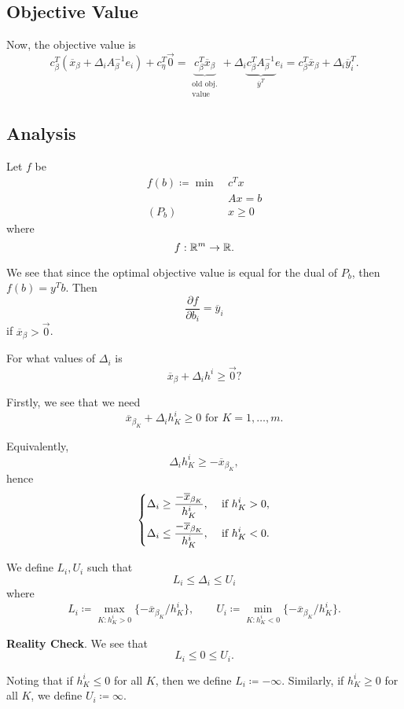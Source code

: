 \subsection{Objective Value}
Now, the objective value is
\[
	c_{\beta}^{T}(\overline{x}_{\beta}+\Delta_{i}A_{\beta}^{-1}e_{i})+ c_{\eta}^{T}\vec{0} = \underbrace{c_{\beta}^{T}\overline{x}_{\beta}}_{\substack{\text{old obj.}\\\text{value}}}+\Delta_{i}\underbrace{c_{\beta}^{T}A_{\beta}^{-1}}_{\overline{y}^{T}}e_{i} = c_{\beta}^{T}\overline{x}_{\beta}+\Delta_{i}\overline{y}^{T}_i.
\]

\subsection{Analysis}
Let \(f\) be
\begin{align*}
	f(b)\coloneqq \min~ & c^Tx    \\
	                    & Ax = b  \\
	(P_b)\quad          & x\geq 0
\end{align*}
where
\[
	f: \mathbb{\MakeUppercase{R}}^{m}\to \mathbb{\MakeUppercase{R}}.
\]

We see that since the optimal objective value is equal for the dual of \(P_b\), then \(f(b) = y^{T}b\). Then
\[
	\frac{\partial f}{\partial b_{i}} = \overline{y}_i
\]
if \(\overline{x}_{\beta}>\vec{0}\).

\begin{problem}
For what values of \(\Delta_{i}\) is
\[
	\overline{x}_{\beta} + \Delta_{i}h^i \geq \vec{0}?
\]
\end{problem}
\begin{answer}
	Firstly, we see that we need
	\[
		\overline{x}_{\beta_K}+\Delta_{i}h^i_K \geq 0 \text{ for }K = 1, \ldots , m.
	\]

	Equivalently,
	\[
		\Delta_{i}h^i_K \geq -\overline{x}_{\beta_K},
	\]
	hence
	\[
		\begin{dcases}
			\Delta_{i}\geq \frac{-\overline{x}_{\beta_K}}{h^i_K}, & \text{ if }h^i_K>0, \\
			\Delta_{i}\leq \frac{-\overline{x}_{\beta_K}}{h^i_K}, & \text{ if }h^i_K<0.
		\end{dcases}
	\]

	We define \(L_{i}, U_{i}\) such that
	\[
		L_{i}\leq \Delta_{i}\leq U_{i}
	\]
	where
	\[
		L_{i} \coloneqq \max_{K\colon h^i_K > 0}\{-\overline{x}_{\beta_K}/h^i_K\},\qquad U_{i} \coloneqq \min_{K\colon h^i_K < 0}\{-\overline{x}_{\beta_K}/h^i_K\}.
	\]

	\textbf{Reality Check}. We see that
	\[
		L_{i}\leq 0\leq U_{i}.
	\]

	\begin{remark}
		Noting that if \(h^i_K\leq 0\) for all \(K\), then we define \(L_{i} \coloneqq -\infty \). Similarly, if \(h^i_K\geq 0\) for all \(K\), we define \(U_i \coloneqq \infty \).
	\end{remark}
\end{answer}

